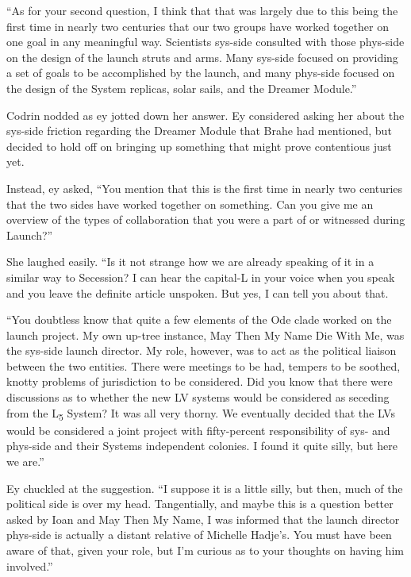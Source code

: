 ``As for your second question, I think that that was largely due to this being the first time in nearly two centuries that our two groups have worked together on one goal in any meaningful way. Scientists sys-side consulted with those phys-side on the design of the launch struts and arms. Many sys-side focused on providing a set of goals to be accomplished by the launch, and many phys-side focused on the design of the System replicas, solar sails, and the Dreamer Module.''

Codrin nodded as ey jotted down her answer. Ey considered asking her about the sys-side friction regarding the Dreamer Module that Brahe had mentioned, but decided to hold off on bringing up something that might prove contentious just yet.

Instead, ey asked, ``You mention that this is the first time in nearly two centuries that the two sides have worked together on something. Can you give me an overview of the types of collaboration that you were a part of or witnessed during Launch?''

She laughed easily. ``Is it not strange how we are already speaking of it in a similar way to Secession? I can hear the capital-L in your voice when you speak and you leave the definite article unspoken. But yes, I can tell you about that.

``You doubtless know that quite a few elements of the Ode clade worked on the launch project. My own up-tree instance, May Then My Name Die With Me, was the sys-side launch director. My role, however, was to act as the political liaison between the two entities. There were meetings to be had, tempers to be soothed, knotty problems of jurisdiction to be considered. Did you know that there were discussions as to whether the new LV systems would be considered as seceding from the L\textsubscript{5} System? It was all very thorny. We eventually decided that the LVs would be considered a joint project with fifty-percent responsibility of sys- and phys-side and their Systems independent colonies. I found it quite silly, but here we are.''\pagebreak

Ey chuckled at the suggestion. ``I suppose it is a little silly, but then, much of the political side is over my head. Tangentially, and maybe this is a question better asked by Ioan and May Then My Name, I was informed that the launch director phys-side is actually a distant relative of Michelle Hadje's. You must have been aware of that, given your role, but I'm curious as to your thoughts on having him involved.''


